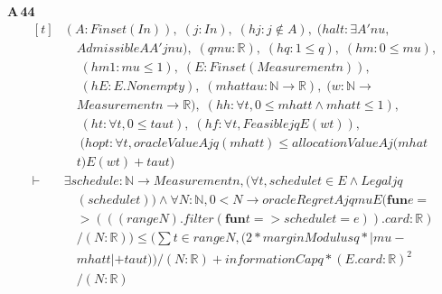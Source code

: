 \noindent\textbf{A\,44}\quad{}
{\footnotesize\[ \begin{aligned}[t]
&(\mathit{A} : \mathit{Finset} (\mathit{I} \mathit{n})),\; (\mathit{j} : \mathit{I} \mathit{n}),\; (\mathit{hj} : \mathit{j} \notin \mathit{A}),\; (\mathit{halt} : \exists \mathit{A'} \mathit{nu},\\
&\quad \mathit{Admissible} \mathit{A} \mathit{A'} \mathit{j} \mathit{nu}),\; (\mathit{q} \mathit{mu} : \mathbb{R} ),\; (\mathit{hq} : 1 \leq \mathit{q}),\; (\mathit{hm} : 0 \leq \mathit{mu}),\\
&\quad \; (\mathit{hm1} : \mathit{mu} \leq 1),\; (\mathit{E} : \mathit{Finset} (\mathit{Measurement} \mathit{n})),\\
&\quad \; (\mathit{hE} : \mathit{E}.\mathit{Nonempty}),\; (\mathit{mhat} \mathit{tau} : \mathbb{N} \to \mathbb{R} ),\; (\mathit{w} : \mathbb{N} \to\\
&\quad \mathit{Measurement} \mathit{n} \to \mathbb{R} ),\; (\mathit{hh} : \forall \mathit{t},0 \leq \mathit{mhat} \mathit{t} \wedge \mathit{mhat} \mathit{t} \leq 1),\\
&\quad \; (\mathit{ht} : \forall \mathit{t},0 \leq \mathit{tau} \mathit{t}),\; (\mathit{hf} : \forall \mathit{t},\mathit{Feasible} \mathit{j} \mathit{q} \mathit{E} (\mathit{w} \mathit{t})),\\
&\quad \; (\mathit{hopt} : \forall \mathit{t},\mathit{oracleValue} \mathit{A} \mathit{j} \mathit{q} (\mathit{mhat} \mathit{t}) \leq \mathit{allocationValue} \mathit{A} \mathit{j} (\mathit{mhat}\\
&\quad \mathit{t}) \mathit{E} (\mathit{w} \mathit{t})+\mathit{tau} \mathit{t})\\
\vdash\;&\exists \mathit{schedule} : \mathbb{N} \to \mathit{Measurement} \mathit{n}, (\forall \mathit{t},\mathit{schedule} \mathit{t} \in \mathit{E} \wedge \mathit{Legal} \mathit{j} \mathit{q}\\
&\quad (\mathit{schedule} \mathit{t})) \wedge \forall \mathit{N} : \mathbb{N} ,0 < \mathit{N} \to \mathit{oracleRegret} \mathit{A} \mathit{j} \mathit{q} \mathit{mu} \mathit{E} (\mathbf{fun} \mathit{e} =\\
&\quad > (((\mathit{range} \mathit{N}).\mathit{filter} (\mathbf{fun} \mathit{t} => \mathit{schedule} \mathit{t}=\mathit{e})).\mathit{card}:\mathbb{R} )\\
&\quad /(\mathit{N}:\mathbb{R} )) \leq (\textstyle\sum \mathit{t} \in \mathit{range} \mathit{N},(2*\mathit{marginModulus} \mathit{q}*|\mathit{mu}-\\
&\quad \mathit{mhat} \mathit{t}|+\mathit{tau} \mathit{t}))/(\mathit{N}:\mathbb{R} ) +\mathit{informationCap} \mathit{q}*(\mathit{E}.\mathit{card}:\mathbb{R} )^{2}\\
&\quad /(\mathit{N}:\mathbb{R} )
\end{aligned} \]}

